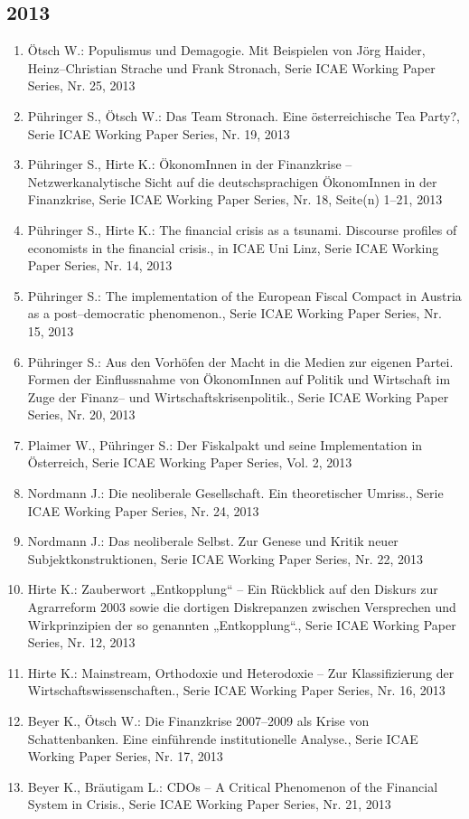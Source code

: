 \subsection*{2013}
\begin{enumerate}
    	 \item Ötsch W.: Populismus und Demagogie. Mit Beispielen von Jörg Haider, Heinz–Christian Strache und Frank Stronach, Serie ICAE Working Paper Series, Nr. 25, 2013
	 \item Pühringer S., Ötsch W.: Das Team Stronach. Eine österreichische Tea Party?, Serie ICAE Working Paper Series, Nr. 19, 2013
	 \item Pühringer S., Hirte K.: ÖkonomInnen in der Finanzkrise -- Netzwerkanalytische Sicht auf die deutschsprachigen ÖkonomInnen in der Finanzkrise, Serie ICAE Working Paper Series, Nr. 18, Seite(n) 1--21, 2013
	 \item Pühringer S., Hirte K.: The financial crisis as a tsunami. Discourse profiles of economists in the financial crisis., in ICAE Uni Linz, Serie ICAE Working Paper Series, Nr. 14, 2013
	 \item Pühringer S.: The implementation of the European Fiscal Compact in Austria as a post--democratic phenomenon., Serie ICAE Working Paper Series, Nr. 15, 2013
	 \item Pühringer S.: Aus den Vorhöfen der Macht in die Medien zur eigenen Partei. Formen der Einflussnahme von ÖkonomInnen auf Politik und Wirtschaft im Zuge der Finanz--­ und Wirtschaftskrisenpolitik., Serie ICAE Working Paper Series, Nr. 20, 2013
	 \item Plaimer W., Pühringer S.: Der Fiskalpakt und seine Implementation in Österreich, Serie ICAE Working Paper Series, Vol. 2, 2013
	 \item Nordmann J.: Die neoliberale Gesellschaft. Ein theoretischer Umriss., Serie ICAE Working Paper Series, Nr. 24, 2013
	 \item Nordmann J.: Das neoliberale Selbst. Zur Genese und Kritik neuer Subjektkonstruktionen, Serie ICAE Working Paper Series, Nr. 22, 2013
	 \item Hirte K.: Zauberwort „Entkopplung“ – Ein Rückblick auf den Diskurs zur Agrarreform 2003 sowie die dortigen Diskrepanzen zwischen Versprechen und Wirkprinzipien der so genannten „Entkopplung“., Serie ICAE Working Paper Series, Nr. 12, 2013
	 \item Hirte K.: Mainstream, Orthodoxie und Heterodoxie -- Zur Klassifizierung der Wirtschaftswissenschaften., Serie ICAE Working Paper Series, Nr. 16, 2013
	 \item Beyer K., Ötsch W.: Die Finanzkrise 2007--2009 als Krise von Schattenbanken. Eine einführende institutionelle Analyse., Serie ICAE Working Paper Series, Nr. 17, 2013
	 \item Beyer K., Bräutigam L.: CDOs – A Critical Phenomenon of the Financial System in Crisis., Serie ICAE Working Paper Series, Nr. 21, 2013
\end{enumerate}
